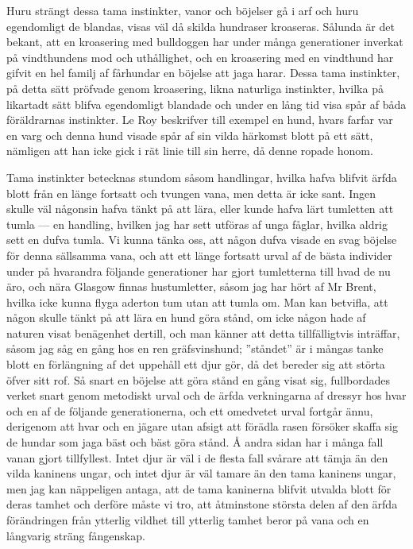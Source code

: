 Huru strängt dessa tama instinkter, vanor och böjelser gå i arf och huru egendomligt de blandas, visas väl då skilda hundraser kroaseras. Sålunda är det bekant, att en kroasering med bulldoggen har under många generationer inverkat på vindthundens mod och uthållighet, och en kroasering med en vindthund har gifvit en hel familj af fårhundar en böjelse att jaga harar. Dessa tama instinkter, på detta sätt pröfvade genom kroasering, likna naturliga instinkter, hvilka på likartadt sätt blifva egendomligt blandade och under en lång tid visa spår af båda föräldrarnas instinkter. Le Roy beskrifver till exempel en hund, hvars farfar var en varg och denna hund visade spår af sin vilda härkomst blott på ett sätt, nämligen att han icke gick i rät linie till sin herre, då denne ropade honom.

Tama instinkter betecknas stundom såsom handlingar, hvilka hafva blifvit ärfda blott från en länge fortsatt och tvungen vana, men detta är icke sant. Ingen skulle väl någonsin hafva tänkt på att lära, eller kunde hafva lärt tumletten att tumla — en handling, hvilken jag har sett utföras af unga fåglar, hvilka aldrig sett en dufva tumla. Vi kunna tänka oss, att någon dufva visade en svag böjelse för denna sällsamma vana, och att ett länge fortsatt urval af de bästa individer under på hvarandra följande generationer har gjort tumletterna till hvad de nu äro, och nära Glasgow finnas hustumletter, såsom jag har hört af Mr Brent, hvilka icke kunna flyga aderton tum utan att tumla om. Man kan betvifla, att någon skulle tänkt på att lära en hund göra stånd, om icke någon hade af naturen visat benägenhet dertill, och man känner att detta tillfälligtvis inträffar, såsom jag såg en gång hos en ren gräfsvinshund; ”ståndet” är i mångas tanke blott en förlängning af det uppehåll ett djur gör, då det bereder sig att störta öfver sitt rof. Så snart en böjelse att göra stånd en gång visat sig, fullbordades verket snart genom metodiskt urval och de ärfda verkningarna af dressyr hos hvar och en af de följande generationerna, och ett omedvetet urval fortgår ännu, derigenom att hvar och en jägare utan afsigt att förädla rasen försöker skaffa sig de hundar som jaga bäst och bäst göra stånd. Å andra sidan har i många fall vanan gjort tillfyllest. Intet djur är väl i de flesta fall svårare att tämja än den vilda kaninens ungar, och intet djur är väl tamare än den tama kaninens ungar, men jag kan näppeligen antaga, att de tama kaninerna blifvit utvalda blott för deras tamhet och derföre måste vi tro, att åtminstone största delen af den ärfda förändringen från ytterlig vildhet till ytterlig tamhet beror på vana och en långvarig sträng fångenskap.

